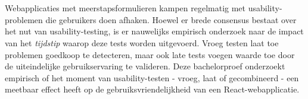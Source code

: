 
%
%
%
%
%

%



\chapter*{}

Webapplicaties met meerstapsformulieren kampen regelmatig met usability-problemen die gebruikers doen afhaken. Hoewel er brede consensus bestaat over het nut van usability-testing, is er nauwelijks empirisch onderzoek naar de impact van het \textit{tijdstip} waarop deze tests worden uitgevoerd. Vroeg testen laat toe problemen goedkoop te detecteren, maar ook late tests voegen waarde toe door de uiteindelijke gebruikservaring te valideren. Deze bachelorproef onderzoekt empirisch of het moment van usability-testen - vroeg, laat of gecombineerd - een meetbaar effect heeft op de gebruiksvriendelijkheid van een React-webapplicatie.

